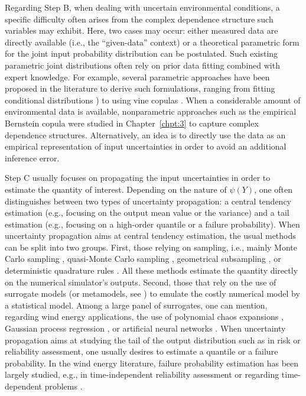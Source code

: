 Regarding Step B, when dealing with uncertain environmental conditions, a specific difficulty 
often arises from the complex dependence structure such variables may exhibit. 
Here, two cases may occur: either measured data are directly available (i.e., the ``given-data'' context) or a theoretical parametric form for the joint input probability distribution can be postulated.
Such existing parametric joint distributions often rely on prior data fitting combined with expert knowledge. 
For example, several parametric approaches have been proposed in the literature to derive such formulations, ranging from fitting conditional distributions \citealp{vanem_fekhari_2023}) to using vine copulas \citep{li_zhan_2020}. 
When a considerable amount of environmental data is available, nonparametric approaches such as the empirical Bernstein copula were studied in Chapter~\ref{chpt:3} to capture complex dependence structures. 
Alternatively, an idea is to directly use the data as an empirical representation of input uncertainties in order to avoid an additional inference error. 

Step C usually focuses on propagating the input uncertainties in order to estimate the quantity of interest. 
Depending on the nature of $\psi(Y)$, one often distinguishes between two types of uncertainty propagation: a central tendency estimation (e.g., focusing on the output mean value or the variance) and a tail estimation (e.g., focusing on a high-order quantile or a failure probability). 
When uncertainty propagation aims at central tendency estimation, the usual methods can be split into two groups. 
First, those relying on sampling, i.e., mainly Monte Carlo sampling \citep{graf_2016}, quasi-Monte Carlo sampling \citep{muller_cheng_2018}, geometrical subsampling \citep{kanner_2018_OMAE}, or deterministic quadrature rules \citep{bos_2020}. 
All these methods estimate the quantity directly on the numerical simulator's outputs. 
Second, those that rely on the use of surrogate models (or metamodels, see ) to emulate the costly numerical model by a statistical model. 
Among a large panel of surrogates, one can mention, regarding wind energy applications, the use of polynomial chaos expansions \citep{dimitrov_kelly_2018, murcia_dimitrov_2018}, Gaussian process regression \citep{huchet_2019,teixeira_gp_2019,slot_sorensen_2020,wilkie_galasso_2021}, or artificial neural networks \citep{aoues_2023}. 
When uncertainty propagation aims at studying the tail of the output distribution such as in risk or reliability assessment, one usually desires to estimate a quantile or a failure probability. 
In the wind energy literature, failure probability estimation has been largely studied, e.g., in time-independent reliability assessment \citep{zwick_muskulus_2015,slot_sorensen_2020,wilkie_galasso_2021} or regarding time-dependent problems \citep{abdallah_lataniotis_2019,lataniotis_2019}.

